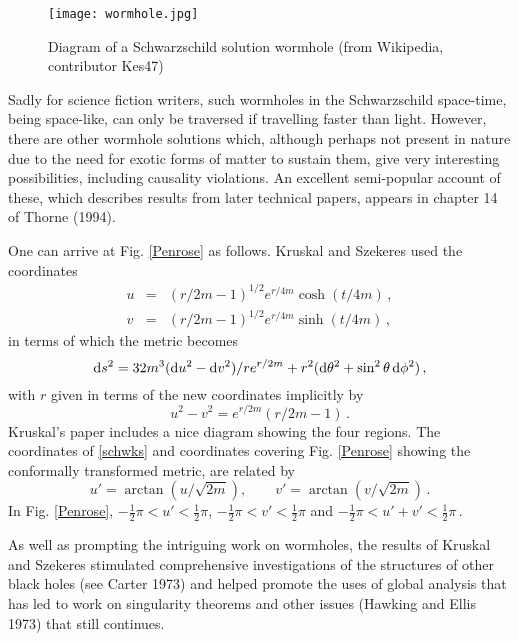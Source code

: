 \documentclass[11pt]{article}
\newcommand{\shalf}{{\ensuremath{\scriptstyle\frac{1}{2}}}}
\newcommand{\dx}{{\mbox{\rm d}}}
\begin{document}
\begin{figure}[h]
\begin{center}
\texttt{[image: wormhole.jpg]}
\end{center}
\caption{\scriptsize  Diagram of a Schwarzschild solution wormhole (from Wikipedia, contributor Kes47)}\label{worm}
\end{figure}
Sadly for science fiction writers, such wormholes in the Schwarzschild space-time, being space-like, can only be 
traversed if travelling faster than light. However, there are other wormhole solutions which, although perhaps 
not present in nature due to the need for exotic forms of matter to sustain them, give very interesting possibilities,  
including causality violations. An excellent semi-popular account of these, which describes results from later 
technical papers, appears in chapter 14 of Thorne (1994).
\par\smallskip%
One can arrive at Fig. \ref{Penrose} as follows. Kruskal and Szekeres used the coordinates
\begin{eqnarray}\label{krusszek}
  u &=& (r/2m - 1)^{1/2}e^{r/4m}\cosh (t/4m)\,,\\
  v &=& (r/2m - 1)^{1/2}e^{r/4m}\sinh (t/4m)\,,
  \end{eqnarray}
 in terms of which the metric becomes
  \begin{equation}\label{schwks}
   \dx s^2  =  32m^3 (\dx u^2  - \dx v^2 )/re^{r/2m}+ r^2 (\dx \theta^2  + \sin^2 \theta\, \dx \phi^2 )\,,
  \end{equation}
 with $r$ given in terms of the new coordinates implicitly by
 \begin{equation}\label{kstrans2}
   u^2  - v^2  = e^{r/2m} (r/2m - 1)\,.
 \end{equation}
Kruskal's paper includes a nice diagram showing the four regions. The coordinates of \eqref{schwks} and coordinates 
covering Fig. \ref{Penrose} showing the conformally transformed metric, are related by
 \begin{equation}
 u' = \arctan(u/\sqrt{2m}), \qquad v' = \arctan(v/\sqrt{2m})\,.
 \end{equation}
In Fig. \ref{Penrose}, $-\shalf \pi < u' < \shalf \pi$, $-\shalf \pi < v' < \shalf \pi$ and $-\shalf \pi < u' +v' < \shalf \pi$\,.
\par\smallskip%
 As well as prompting the intriguing work on wormholes, the results of Kruskal and Szekeres stimulated comprehensive 
investigations of the structures of other black holes (see Carter 1973) and helped promote the uses of global analysis 
that has led to work on singularity theorems and other issues (Hawking and Ellis 1973) that still continues.
\end{document}
